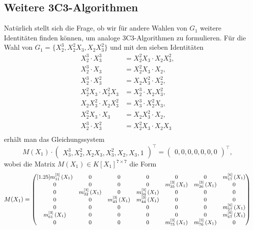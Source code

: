 \documentclass[a4paper,oneside, 11pt, openany%
]{article}
\theoremstyle{custom}
\theoremstyle{custom}
\begin{document}
\subsection{Weitere 3C3-Algorithmen}
Natürlich stellt sich die Frage, ob wir für andere Wahlen von $G_1$ weitere Identitäten finden können, um analoge 3C3-Algorithmen zu formulieren.
Für die Wahl von $G_1 = \{X_2^3,X_2^2X_3,X_2X_3^2\}$ und mit den sieben Identitäten
\begin{equation}
	\begin{alignedat}{1}
		X_{2}^{3}\cdot X_{3}^3	&=  X_{2}^{2}X_{3}\cdot X_{2}X_3^2, \\
		X_{2}^{3}\cdot X_{3} &=  X_{2}^2X_{3}\cdot X_{2}, \\
		X_{2}^{3}\cdot X_{3}^2 &=  X_{2}X_{3}^2\cdot X_{2}^2, \\
		X_{2}^{2}X_{3} \cdot X_{2}^{2}X_{3}	&= X_{2}^3 \cdot X_{2}X_{3}^2, \\
		X_{2}X_{3}^2 \cdot X_{2}X_{3}^2	&= X_{3}^3 \cdot X_{2}^2X_{3}, \\
		X_{2}^{2}X_{3} \cdot X_{3}	&= X_2X_{3}^2 \cdot X_{2}, \\
		X_{2}^{3} \cdot X_{3}^2 	&=  X_{2}^{2}X_{3}\cdot X_{2}X_{3}\\
	\end{alignedat}
\end{equation}
erhält man das Gleichungssystem
\begin{equation}
	M(X_1) \cdot \begin{pmatrix}
		X_3^3,X_2^2,X_2X_3,X_3^2,X_2,X_3,1
	\end{pmatrix}^\top
	= \begin{pmatrix}
		0,0,0,0,0,0,0
	\end{pmatrix}^\top,
\end{equation}
wobei die Matrix $M(X_1) \in K[X_1]^{7 \times 7}$ die Form
	\begin{equation}
	\small
	M(X_1) = \begin{pmatrix}[1.25]
		m_{11}^{\left[ 3\right]}\left( X_{1}\right) & 0 & 0 &0 & 0 & 0 & m_{17}^{\left[ 6\right]}\left( X_{1}\right)\\
		0 & 0 & 0 & 0 & m_{25}^{\left[ 3\right]}\left( X_{1}\right) & m_{26}^{\left[ 3\right]}\left( X_{1}\right) & 0\\
		0 &  m_{32}^{\left[ 3\right]}\left( X_{1}\right) & 0 &  m_{34}^{\left[ 3\right]}\left( X_{1}\right) & 0 & 0 & 0\\
		 0 & 0 & m_{43}^{\left[ 3\right]}\left( X_{1}\right) & m_{44}^{\left[ 3\right]}\left( X_{1}\right) & 0 &  0 &0\\
		0 & 0 & 0 &  0 & 0 & 0&  m_{57}^{\left[ 6\right]}\left( X_{1}\right)\\
		m_{61}^{\left[ 3\right]}\left( X_{1}\right) & 0 &  0 & 0 & 0 & 0 &m_{67}^{\left[ 6\right]}\left( X_{1}\right)\\
		 0 & 0 & 0 & 0 &  m_{75}^{\left[ 3\right]}\left( X_{1}\right) & m_{76}^{\left[ 3\right]}\left( X_{1}\right) & 0
	\end{pmatrix}
\end{equation}
\end{document}
